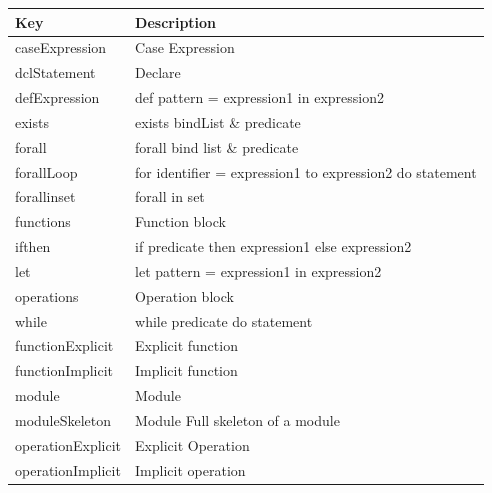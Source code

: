 \documentclass{overturerepchap}
\begin{document}
\begin{longtable}{| l| p{9cm}| }\hline
Key & Description\\\hline
\endhead 
caseExpression            & Case Expression\\
dclStatement              & Declare\\
defExpression             & def pattern = expression1 in expression2\\
exists                    & exists bindList \& predicate\\
forall                    & forall bind list \& predicate\\
forallLoop                & for identifier = expression1 to expression2 do statement\\
forallinset               & forall in set\\
functions                 & Function block\\
ifthen                    & if predicate then expression1 else expression2\\
let                       & let pattern = expression1 in expression2\\
operations                & Operation block\\
while                     & while predicate do statement\\

functionExplicit          & Explicit function\\
functionImplicit          & Implicit function\\
module                    & Module\\
moduleSkeleton            & Module Full skeleton of a module\\
operationExplicit         & Explicit Operation\\
operationImplicit         & Implicit operation\\


\end{longtable}
\end{document}
